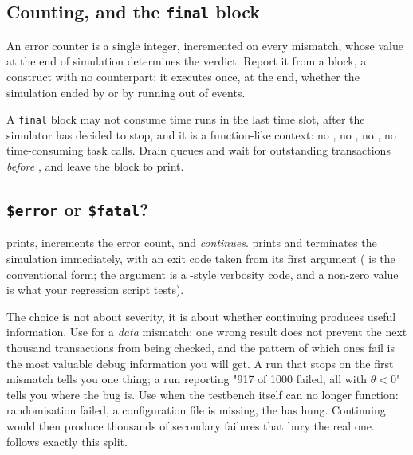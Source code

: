 \subsection{Counting, and the \texttt{final} block}

An error counter is a single integer, incremented on every
mismatch, whose value at the end of simulation determines the verdict. Report
it from a  block, a \SV{} construct with no \VHDL{} counterpart: it
executes once, at the end, whether the simulation ended by  or
by running out of events.


\begin{gotcha}{A \texttt{final} block may not consume time}
 runs in the last time slot, after the simulator has decided to
stop, and it is a function-like context: no \code{\#}, no , no
, no time-consuming task calls. Drain queues and wait for
outstanding transactions \emph{before} , and leave the
 block to print.
\end{gotcha}

\subsection{\texttt{\$error} or \texttt{\$fatal}?}

 prints, increments the error
count, and \emph{continues}.  prints and terminates the
simulation immediately, with an exit code taken from its first argument
( is the conventional form; the argument is a
-style verbosity code, and a non-zero value is what your
regression script tests).

The choice is not about severity, it is about whether continuing produces
useful information. Use  for a \emph{data} mismatch: one wrong
result does not prevent the next thousand transactions from being checked, and
the pattern of which ones fail is the most valuable debug information you will
get. A run that stops on the first mismatch tells you one thing; a run
reporting "917 of 1000 failed, all with $\theta < 0$" tells you where the bug
is. Use  when the testbench itself can no longer function:
randomisation failed, a configuration file is missing, the \DUT{} has hung.
Continuing would then produce thousands of secondary failures that bury the
real one.  follows exactly this split.

